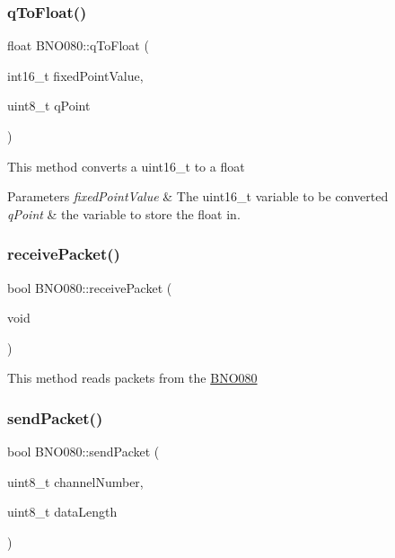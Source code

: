 \subsubsection{\texorpdfstring{qToFloat()}{qToFloat()}}
{\footnotesize\ttfamily float B\+N\+O080\+::q\+To\+Float (\begin{DoxyParamCaption}\item[{int16\+\_\+t}]{fixed\+Point\+Value,  }\item[{uint8\+\_\+t}]{q\+Point }\end{DoxyParamCaption})}

This method converts a uint16\+\_\+t to a float 
\begin{DoxyParams}{Parameters}
{\em fixed\+Point\+Value} & The uint16\+\_\+t variable to be converted \\
\hline
{\em q\+Point} & the variable to store the float in. \\
\hline
\end{DoxyParams}
\mbox{\label{classBNO080_a88d8395534116c51613dda64f105f2fe}} 
\subsubsection{\texorpdfstring{receivePacket()}{receivePacket()}}
{\footnotesize\ttfamily bool B\+N\+O080\+::receive\+Packet (\begin{DoxyParamCaption}\item[{void}]{ }\end{DoxyParamCaption})}

This method reads packets from the \mbox{\hyperlink{classBNO080}{B\+N\+O080}} \mbox{\label{classBNO080_a5923c7c051c3f311aea0535dc17a42e9}} 
\subsubsection{\texorpdfstring{sendPacket()}{sendPacket()}}
{\footnotesize\ttfamily bool B\+N\+O080\+::send\+Packet (\begin{DoxyParamCaption}\item[{uint8\+\_\+t}]{channel\+Number,  }\item[{uint8\+\_\+t}]{data\+Length }\end{DoxyParamCaption})}


